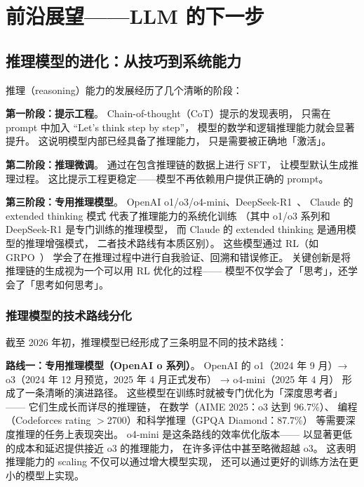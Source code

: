 \chapter{前沿展望——LLM 的下一步}
\label{ch:outlook}

\section{推理模型的进化：从技巧到系统能力}

推理（reasoning）能力的发展经历了几个清晰的阶段：

\textbf{第一阶段：提示工程}。
Chain-of-thought（CoT）提示的发现表明，
只需在 prompt 中加入 ``Let's think step by step''，
模型的数学和逻辑推理能力就会显著提升。
这说明模型内部已经具备了推理能力，
只是需要被正确地「激活」。

\textbf{第二阶段：推理微调}。
通过在包含推理链的数据上进行 SFT，
让模型默认生成推理过程。
这比提示工程更稳定——模型不再依赖用户提供正确的 prompt。

\textbf{第三阶段：专用推理模型}。
OpenAI o1/o3/o4-mini、DeepSeek-R1~\cite{deepseekr1}、
Claude 的 extended thinking 模式
代表了推理能力的系统化训练
（其中 o1/o3 系列和 DeepSeek-R1 是专门训练的推理模型，
而 Claude 的 extended thinking 是通用模型的推理增强模式，
二者技术路线有本质区别）。
这些模型通过 RL（如 GRPO~\cite{shao2024grpo}）
学会了在推理过程中进行自我验证、回溯和错误修正。
关键创新是将推理链的生成视为一个可以用 RL 优化的过程——
模型不仅学会了「思考」，还学会了「思考如何思考」。

\subsection{推理模型的技术路线分化}

截至 2026 年初，推理模型已经形成了三条明显不同的技术路线：

\textbf{路线一：专用推理模型（OpenAI o 系列）}。
OpenAI 的 o1（2024 年 9 月）→ o3（2024 年 12 月预览，2025 年 4 月正式发布）
→ o4-mini（2025 年 4 月）
形成了一条清晰的演进路径。
这些模型在训练时就被专门优化为「深度思考者」——
它们生成长而详尽的推理链，
在数学（AIME 2025：o3 达到 96.7\%）、
编程（Codeforces rating $>$2700）和科学推理（GPQA Diamond：87.7\%）
等需要深度推理的任务上表现突出。
o4-mini 是这条路线的效率优化版本——
以显著更低的成本和延迟提供接近 o3 的推理能力，
在许多评估中甚至略微超越 o3。
这表明推理能力的 scaling 不仅可以通过增大模型实现，
还可以通过更好的训练方法在更小的模型上实现。

